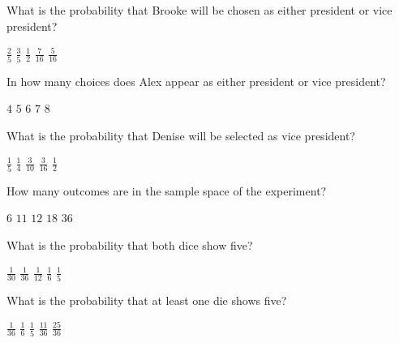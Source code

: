 \documentclass[12pt]{exam}
\begin{document}
\begin{questions}
\question
What is the probability that Brooke will be chosen
as either president or vice president?\\
\begin{oneparchoices}
\choice $\frac{2}{5}$ %
\correctchoice $\frac{3}{5}$
\choice $\frac{1}{2}$ %
\choice $\frac{7}{16}$ %
\choice $\frac{5}{16}$ %
\end{oneparchoices}

\question
In how many choices does Alex appear as either president
or vice president?\\
\begin{oneparchoices}
\correctchoice $4$
\choice $5$ %
\choice $6$ %
\choice $7$
\choice $8$
\end{oneparchoices}

\question\label{LastPresident}
What is the probability that Denise will be selected
as vice president?\\
\begin{oneparchoices}
\correctchoice $\frac{1}{5}$
\choice $\frac{1}{4}$ %
\choice $\frac{3}{10}$ %
\choice $\frac{3}{16}$ %
\choice $\frac{1}{2}$ %
\end{oneparchoices}


\question\label{FirstDice}
How many outcomes are in the sample space of the experiment?\\
\begin{oneparchoices}
\choice $6$ %
\choice $11$ %
\choice $12$ %
\choice $18$
\correctchoice $36$
\end{oneparchoices}

\question What is the probability that both dice show five?\\
\begin{oneparchoices}
\choice $\frac{1}{30}$ %
\correctchoice $\frac{1}{36}$
\choice $\frac{1}{12}$ %
\choice $\frac{1}{6}$
\choice $\frac{1}{5}$ %
\end{oneparchoices}

\question\label{LastDice}
What is the probability that at least one die shows five?\\
\begin{oneparchoices}
\choice $\frac{1}{36}$
\choice $\frac{1}{6}$
\choice $\frac{1}{5}$ %
\correctchoice $\frac{11}{36}$
\choice $\frac{25}{36}$ %
\end{oneparchoices}

\end{questions}
\end{document}
